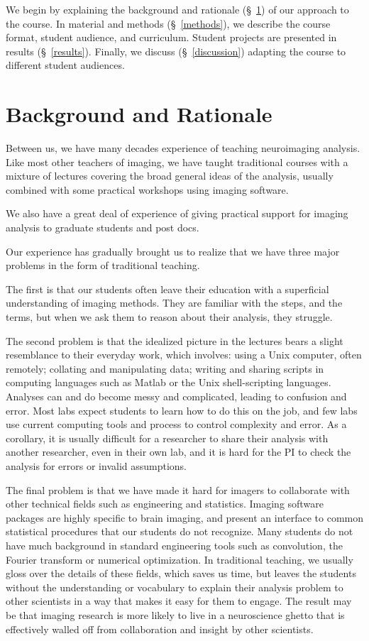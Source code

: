 We begin by explaining the background and rationale (\S~\ref{background}) of our approach to the course.
In material and methods (\S~\ref{methods}), we describe the course format, student audience,
and curriculum.
Student projects are presented in results (\S~\ref{results}).
Finally, we discuss (\S~\ref{discussion}) adapting the course to
different student audiences.

\section{Background and Rationale}\label{background}

Between us, we have many decades experience of teaching neuroimaging analysis.
Like most other teachers of imaging, we have taught traditional courses with a
mixture of lectures covering the broad general ideas of the analysis, usually
combined with some practical workshops using imaging software.

We also have a great deal of experience of giving practical support for
imaging analysis to graduate students and post docs.

Our experience has gradually brought us to realize that we have three major
problems in the form of traditional teaching.

The first is that our students often leave their education with a superficial
understanding of imaging methods.  They are familiar with the steps, and the
terms, but when we ask them to reason about their analysis, they struggle.

The second problem is that the idealized picture in the lectures bears a
slight resemblance to their everyday work, which involves: using a Unix
computer, often remotely; collating and manipulating data; writing and sharing
scripts in computing languages such as Matlab or the Unix shell-scripting
languages.  Analyses can and do become messy and complicated, leading to
confusion and error.  Most labs expect students to learn how to do this on the
job, and few labs use current computing tools and process to control 
complexity and error.  As a corollary, it is usually difficult for a
researcher to share their analysis with another researcher, even in their own
lab, and it is hard for the PI to check the analysis for errors or invalid
assumptions.

The final problem is that we have made it hard for imagers to collaborate with
other technical fields such as engineering and statistics.  Imaging software
packages are highly specific to brain imaging, and present an interface to
common statistical procedures that our students do not recognize.  Many
students do not have much background in standard engineering tools such as
convolution, the Fourier transform or numerical optimization.  In traditional
teaching, we usually gloss over the details of these fields, which saves us
time, but leaves the students without the understanding or vocabulary to
explain their analysis problem to other scientists in a way that makes it easy
for them to engage.  The result may be that imaging research is more likely to
live in a neuroscience ghetto that is effectively walled off from
collaboration and insight by other scientists.

